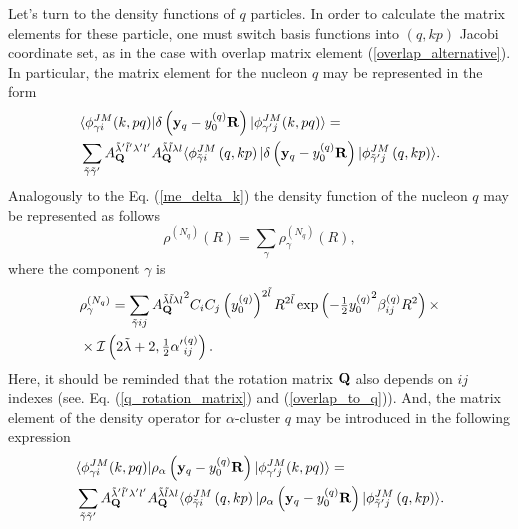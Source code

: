 \documentclass[
12pt, %
oneside, %
english, %
doublespacing, %
doublespacing, %
toctotoc, %
parskip, %
headsepline, %
]{MastersDoctoralThesis} %
\begin{document}
Let's turn to the density functions of $q$ particles.
 In order to calculate the matrix elements for these particle, one must switch basis functions into $(q,kp)$ Jacobi coordinate set, as in the case with overlap matrix element (\ref{overlap_alternative}). 
In particular, the matrix element for the nucleon $q$ may be represented in the form
\begin{align}
&\langle \phi^{JM}_{\gamma i} (k,pq) \vert 
\delta \left( {\bf y}_q-y^{(q)}_0 {\bf R} \right)
\vert \phi^{JM}_{\gamma' j} (k,pq) \rangle = 
\\
&\sum_{\tilde{\gamma} \tilde{\gamma}'}
A^{\tilde{\lambda}' \tilde{l}' \lambda' l'}_{{\bf Q} }
A^{\tilde{\lambda} \tilde{l} \lambda l}_{{\bf Q} }
\langle \phi^{ J M}_{\tilde{\gamma} i}\left(q,kp \right) \vert 
\delta \left( {\bf y}_q-y^{(q)}_0 {\bf R} \right) \vert
\phi^{ J M}_{\tilde{\gamma}^{\prime} j}\left(q,kp \right) \rangle.
\nonumber
\end{align}
Analogously to the  Eq. (\ref{me_delta_k}) the density function of the nucleon $q$ may be represented as follows
\begin{equation}
\label{rho_nq}
\rho^{(N_q)}(R)=\sum_{\gamma} \rho_\gamma^{(N_q)} (R),
\end{equation}
where the component $\gamma$ is
\begin{align}
&\rho_\gamma^{(N_q)}=
\sum_{\tilde{\gamma}ij} 
{A^{\tilde{\lambda} \tilde{l} \lambda l}_{{\bf Q} }}^2
C_iC_j  
\left( y_0^{(q)} \right)^{2\tilde{l}}
R^{2\tilde{l}} 
\exp \left( -\tfrac{1}{2} {y_0^{(q)}}^2 \beta^{(q)}_{ij} R^2 \right) \times 
\\ \nonumber 
& \times
\mathcal{I}\left( 2\tilde{\lambda}+2, \tfrac{1}{2} {\alpha'}_{ij}^{(q)} \right).
\end{align}
Here, it should be reminded that the rotation matrix ${\bf Q}$ also depends on $ij$ indexes (see. Eq. (\ref{q_rotation_matrix}) and (\ref{overlap_to_q})).
And, the matrix element of the density operator for $\alpha$-cluster $q$ may be introduced in the following expression
\begin{align}
&\langle \phi^{JM}_{\gamma i} (k,pq) \vert 
\rho_\alpha \left( {\bf y}_q-y^{(q)}_0 {\bf R} \right)
\vert \phi^{JM}_{\gamma' j} (k,pq) \rangle = 
\\
&\sum_{\tilde{\gamma} \tilde{\gamma}'}
A^{\tilde{\lambda}' \tilde{l}' \lambda' l'}_{{\bf Q} }
A^{\tilde{\lambda} \tilde{l} \lambda l}_{{\bf Q} }
\langle \phi^{ J M}_{\tilde{\gamma} i}\left(q,kp \right) \vert 
\rho_\alpha \left( {\bf y}_q-y^{(q)}_0 {\bf R} \right) \vert
\phi^{ J M}_{\tilde{\gamma}^{\prime} j}\left(q,kp \right) \rangle.
\nonumber
\end{align}
\end{document}
